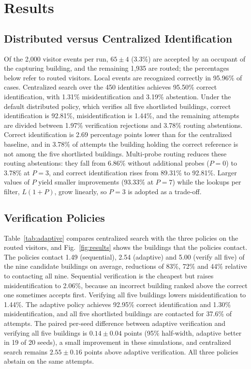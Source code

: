 \documentclass[pdflatex,sn-mathphys-num]{sn-jnl}%
\theoremstyle{thmstyleone}%
\theoremstyle{thmstyletwo}%
\theoremstyle{thmstylethree}%
\begin{document}

\section{Results}
\label{sec:results}

\subsection{Distributed versus Centralized Identification}

Of the 2,000 visitor events per run, $65\pm4$ (3.3\%) are accepted by an occupant of the capturing building, and the remaining 1,935 are routed; the percentages below refer to routed visitors. Local events are recognized correctly in 95.96\% of cases. Centralized search over the 450 identities achieves 95.50\% correct identification, with 1.31\% misidentification and 3.19\% abstention. Under the default distributed policy, which verifies all five shortlisted buildings, correct identification is 92.81\%, misidentification is 1.44\%, and the remaining attempts are divided between 1.97\% verification rejections and 3.78\% routing abstentions. Correct identification is 2.69 percentage points lower than for the centralized baseline, and in 3.78\% of attempts the building holding the correct reference is not among the five shortlisted buildings. Multi-probe routing reduces these routing abstentions: they fall from 6.86\% without additional probes ($P=0$) to 3.78\% at $P=3$, and correct identification rises from 89.31\% to 92.81\%. Larger values of $P$ yield smaller improvements (93.33\% at $P=7$) while the lookups per filter, $L(1+P)$, grow linearly, so $P=3$ is adopted as a trade-off.

\subsection{Verification Policies}

Table~\ref{tab:adaptive} compares centralized search with the three policies on the routed visitors, and Fig.~\ref{fig:results} shows the buildings that the policies contact. The policies contact 1.49 (sequential), 2.54 (adaptive) and 5.00 (verify all five) of the nine candidate buildings on average, reductions of 83\%, 72\% and 44\% relative to contacting all nine. Sequential verification is the cheapest but raises misidentification to 2.06\%, because an incorrect building ranked above the correct one sometimes accepts first. Verifying all five buildings lowers misidentification to 1.44\%. The adaptive policy achieves 92.95\% correct identification and 1.30\% misidentification, and all five shortlisted buildings are contacted for 37.6\% of attempts. The paired per-seed difference between adaptive verification and verifying all five buildings is $0.14\pm0.04$ points (95\% half-width, adaptive better in 19 of 20 seeds), a small improvement in these simulations, and centralized search remains $2.55\pm0.16$ points above adaptive verification. All three policies abstain on the same attempts.
\end{document}
